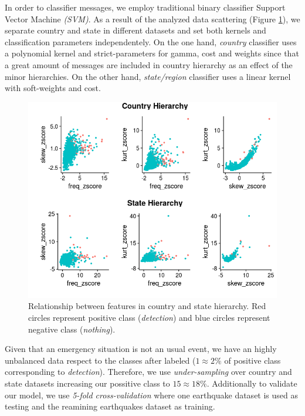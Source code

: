 \documentclass[sigconf]{acmart}
\begin{document}
In order to classifier messages, we employ traditional binary classifier Support Vector Machine \textit{(SVM)}. As a result of the analyzed data scattering (Figure \ref{fig:scatter}), we separate country and state in different datasets and set both kernels and classification parameters independentely. On the one hand, \textit{country} classifier uses a polynomial kernel and strict-parameters for gamma, cost and weights since that a great amount of messages are included in country hierarchy as an effect of the minor hierarchies. On the other hand, \textit{state/region} classifier uses a linear kernel with soft-weights and cost.

\begin{figure}
	\centering
	\includegraphics[width=\columnwidth]{img/scatter.png}
	\caption{Relationship between features in country and state hierarchy. Red circles represent positive class (\textit{detection}) and blue circles represent negative class (\textit{nothing}).}
	\label{fig:scatter}
\end{figure}


Given that an emergency situation is not an usual event, we have an highly unbalanced data respect to the classes after labeled ($1\approx2\%$ of positive class corresponding to \textit{detection}). Therefore, we use \textit{under-sampling} \cite{lunardon2014rose} over country and state datasets increasing our possitive class to $15\approx18\%$. Additionally to validate our model, we use \textit{5-fold cross-validation} where one earthquake dataset is used as testing and the reamining earthquakes dataset as training.
\end{document}

